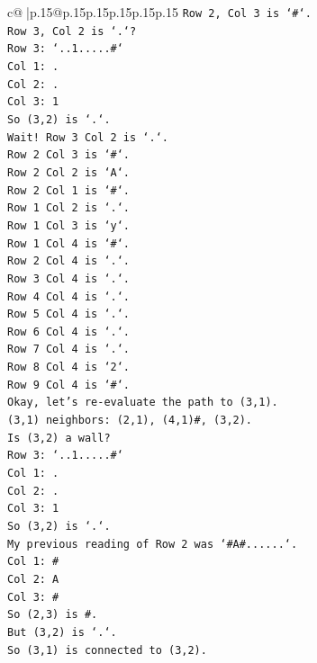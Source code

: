 \documentclass{article}
\begin{document}
{\begin{supertabular}{c@{$\;$}|p{.15\linewidth}@{}p{.15\linewidth}p{.15\linewidth}p{.15\linewidth}p{.15\linewidth}p{.15\linewidth}}
{{{\texttt{Row 2, Col 3 is `\#`.} \\
\texttt{Row 3, Col 2 is `.`?} \\
\texttt{Row 3: `..1.....\#`} \\
\texttt{Col 1: .} \\
\texttt{Col 2: .} \\
\texttt{Col 3: 1} \\
\texttt{So (3,2) is `.`.} \\
\texttt{Wait! Row 3 Col 2 is `.`.} \\
\texttt{Row 2 Col 3 is `\#`.} \\
\texttt{Row 2 Col 2 is `A`.} \\
\texttt{Row 2 Col 1 is `\#`.} \\
\texttt{Row 1 Col 2 is `.`.} \\
\texttt{Row 1 Col 3 is `y`.} \\
\texttt{Row 1 Col 4 is `\#`.} \\
\texttt{Row 2 Col 4 is `.`.} \\
\texttt{Row 3 Col 4 is `.`.} \\
\texttt{Row 4 Col 4 is `.`.} \\
\texttt{Row 5 Col 4 is `.`.} \\
\texttt{Row 6 Col 4 is `.`.} \\
\texttt{Row 7 Col 4 is `.`.} \\
\texttt{Row 8 Col 4 is `2`.} \\
\texttt{Row 9 Col 4 is `\#`.} \\
\texttt{Okay, let's re{-}evaluate the path to (3,1).} \\
\texttt{(3,1) neighbors: (2,1), (4,1)\#, (3,2).} \\
\texttt{Is (3,2) a wall?} \\
\texttt{Row 3: `..1.....\#`} \\
\texttt{Col 1: .} \\
\texttt{Col 2: .} \\
\texttt{Col 3: 1} \\
\texttt{So (3,2) is `.`.} \\
\texttt{My previous reading of Row 2 was `\#A\#......`.} \\
\texttt{Col 1: \#} \\
\texttt{Col 2: A} \\
\texttt{Col 3: \#} \\
\texttt{So (2,3) is \#.} \\
\texttt{But (3,2) is `.`.} \\
\texttt{So (3,1) is connected to (3,2).} \\
}}}
\end{supertabular}}
\end{document}
